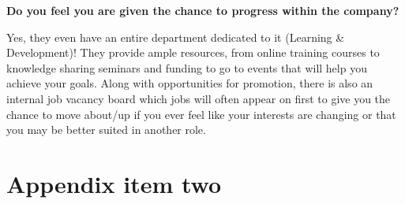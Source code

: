 \documentclass{scrartcl}
\begin{document}
\begin{appendices}
\par
\textbf{Do you feel you are given the chance to progress within the company?}
\par
Yes, they even have an entire department dedicated to it (Learning \& Development)! They provide ample resources, from online training courses to knowledge sharing seminars and funding to go to events that will help you achieve your goals. Along with opportunities for promotion, there is also an internal job vacancy board which jobs will often appear on first to give you the chance to move about/up if you ever feel like your interests are changing or that you may be better suited in another role.


\section{Appendix item two}
\end{appendices}



\end{document}
